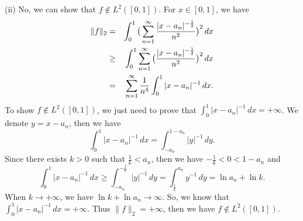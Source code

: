 \documentclass[12pt]{article}
\begin{document}
(ii) No, we can show that $f \notin L^{2}([0,1])$. For $x \in [0, 1]$, we have
\begin{eqnarray*}
\|f\|_{2} & =& \int_{0}^{1} \big{(} \sum_{n = 1}^{\infty} \frac{|x - a_{n}|^{- \frac{1}{2}}}{n^{2}}\big{)}^{2}  \, d x  \\
& \geq & \int_{0}^{1} \sum_{n = 1}^{\infty} \big{(} \frac{|x - a_{n}|^{- \frac{1}{2}}}{n^{2}}\big{)}^{2}  \, d x  \\
& = & \sum_{n = 1}^{\infty} \frac{1}{n^{4}} \int_{0}^{1} |x - a_{n}|^{-1} \, d x .
\end{eqnarray*}
To show $f \notin L^{2}([0,1])$, we just need to prove that $\int_{0}^{1} |x - a_{n}|^{-1} \, d x = + \infty$. We denote $y = x - a_{n}$, then we have
\begin{equation*}
   \int_{0}^{1} |x - a_{n}|^{-1} \, d x = \int_{-a_{n}}^{1 - a_{n}} |y|^{-1} \, d y.
\end{equation*}
Since there exists $k > 0$ such that $\frac{1}{k} < a_{n}$, then we have $- \frac{1}{k} < 0 < 1 - a_{n}$ and
\begin{equation*}
   \int_{0}^{1} |x - a_{n}|^{-1} \, d x \geq \int_{-a_{n}}^{- \frac{1}{k}} |y|^{-1} \, d y = \int_{\frac{1}{k}}^{a_{n}} y^{-1} \, d y = \ln a_{n} + \ln k.
\end{equation*}
When $k \to + \infty$, we have $\ln k+ \ln a_{n} \to \infty$. So, we know that $\int_{0}^{1} |x - a_{n}|^{-1} \, d x = + \infty$. Thus $\|f\|_{2} = + \infty$, then we have $f \notin L^{2}([0,1])$.
\end{document}
